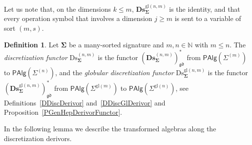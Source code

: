 \documentclass[a4paper, reqno
]{amsart}
\newcommand{\sig}[1]{\mathbf{#1}}             %
\newcommand{\gd}{\mathfrak{gd}}              %
\newcommand{\gl}{\mathrm{gl}}                %
\newcommand{\Ds}{\mathrm{Ds}}
\newcommand{\bDs}{\mathbf{Ds}}
\theoremstyle{plain}
\theoremstyle{definition}
\newtheorem{definition}[theorem]{Definition}
\begin{document}
Let us note that, on the dimensions $k\leq m$, $\bDs^{\gl(n,m)}_{\sig{\Sigma}}$ is the identity, and that every operation symbol that involves a dimension $j\geq m$ is sent to a variable of sort $(m,s)$.

\begin{definition}\label{DDiscretization}
Let $\sig{\Sigma}$ be a many-sorted signature and $m,n\in\mathbb{N}$ with $m\leq n$.
The \emph{discretization functor} $\Ds^{(n,m)}_{\sig{\Sigma}}$ is the functor $(\bDs^{(n,m)}_{\sig{\Sigma}})^{\ast}_{\gd}$ from $\mathsf{PAlg}(\Sigma^{(m)})$ to $\mathsf{PAlg}(\Sigma^{(n)})$, and the \emph{globular discretization functor} $\Ds^{\gl(n,m)}_{\sig{\Sigma}}$ is the functor $(\bDs^{\gl(n,m)}_{\sig{\Sigma}})^{\ast}_{\gd}$ from $\mathsf{PAlg}(\Sigma^{\gl(m)})$ to $\mathsf{PAlg}(\Sigma^{\gl(n)})$, see Definitions~\ref{DDiscDerivor} and~\ref{DDiscGlDerivor} and Proposition~\ref{PGenHepDerivorFunctor}.
\end{definition}

In the following lemma we describe the transformed algebras along the discretization derivors.
\end{document}
